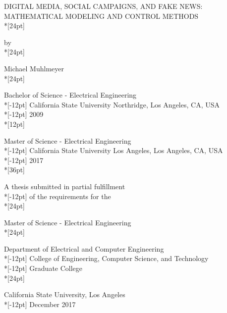 \thispagestyle{empty}%
 \begin{center}
 DIGITAL MEDIA, SOCIAL CAMPAIGNS, AND FAKE NEWS:\\ MATHEMATICAL MODELING AND CONTROL METHODS\\*[24pt]%

\normalsize by\\*[24pt]

Michael Muhlmeyer\\*[24pt]

 Bachelor of Science - Electrical Engineering\\*[-12pt]%
 California State University Northridge, Los Angeles, CA, USA\\*[-12pt]
 2009\\*[12pt]
 
 Master of Science - Electrical Engineering\\*[-12pt]%
  California State University Los Angeles, Los Angeles, CA, USA\\*[-12pt]
 2017\\*[36pt]

 A thesis submitted in partial fulfillment\\*[-12pt]
 of the requirements for the\\*[24pt]

 {Master of Science - Electrical Engineering} \\*[24pt]
 
 {Department of Electrical and Computer Engineering}\\*[-12pt]
 {College of Engineering, Computer Science, and Technology}\\*[-12pt]
 {Graduate College}\\*[24pt]
 
 {California State University, Los Angeles}\\*[-12pt]
 {December 2017}
\end{center}
